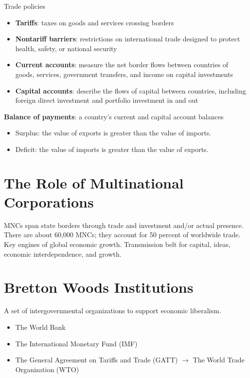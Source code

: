 \documentclass[
]{book}
\begin{document}
Trade policies

\begin{itemize}
\item
  \textbf{Tariffs}: taxes on goods and services crossing borders
\item
  \textbf{Nontariff barriers}: restrictions on international trade designed to protect health, safety, or national security
\item
  \textbf{Current accounts}: measure the net border flows between countries of goods, services, government transfers, and income on capital investments
\item
  \textbf{Capital accounts}: describe the flows of capital between countries, including foreign direct investment and portfolio investment in and out
\end{itemize}

\textbf{Balance of payments}: a country's current and capital account balances

\begin{itemize}
\item
  Surplus: the value of exports is greater than the value of imports.
\item
  Deficit: the value of imports is greater than the value of exports.
\end{itemize}

\hypertarget{the-role-of-multinational-corporations}{%
\section{The Role of Multinational Corporations}\label{the-role-of-multinational-corporations}}

MNCs span state borders through trade and investment and/or actual presence. There are about 60,000 MNCs; they account for 50 percent of worldwide trade. Key engines of global economic growth. Transmission belt for capital, ideas, economic interdependence, and growth.

\hypertarget{bretton-woods-institutions}{%
\section{Bretton Woods Institutions}\label{bretton-woods-institutions}}

A set of intergovernmental organizations to support economic liberalism.

\begin{itemize}
\item
  The World Bank
\item
  The International Monetary Fund (IMF)
\item
  The General Agreement on Tariffs and Trade (GATT) \(\rightarrow\) The World Trade Organization (WTO)
\end{itemize}
\end{document}
